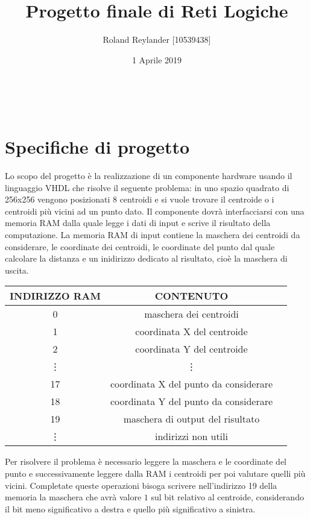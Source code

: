\documentclass{article}
\title{Progetto finale di Reti Logiche}
\author{Roland Reylander [10539438]}
\date{1 Aprile 2019}
\begin{document}
\maketitle
\leavevmode
\\[21\baselineskip]
\tableofcontents


\pagebreak

\section{Specifiche di progetto}
Lo scopo del progetto \`e la realizzazione di un componente hardware usando il linguaggio VHDL che risolve il seguente problema: in uno spazio quadrato di 256x256 vengono posizionati 8 centroidi e si vuole trovare il centroide o i centroidi pi\`{u} vicini ad un punto dato.
\newline
Il componente dovr\`{a} interfacciarsi con una memoria RAM dalla quale legge i dati di input e scrive il risultato della computazione. La memoria RAM di input contiene la maschera dei centroidi da considerare, le coordinate dei centroidi, le coordinate del punto dal quale calcolare la distanza e un inidirizzo dedicato al risultato, cio\`{e} la maschera di uscita.
\newline

\renewcommand{\arraystretch}{1.5}
\begin{center}

\begin{tabular}{ |c|c|c| }
	\hline
	INDIRIZZO RAM & CONTENUTO \\ 
	\hline
	0 & maschera dei centroidi \\
	\hline
	1 & coordinata X del centroide \\
	\hline
	2 & coordinata Y del centroide \\
	\hline
	\vdots & \vdots \\
	\hline
	17 & coordinata X del punto da considerare \\
	\hline
	18 & coordinata Y del punto da considerare \\
	\hline
	19 & maschera di output del risultato \\
	\hline
	\vdots & indirizzi non utili \\
	\hline
\end{tabular}
\end{center}
\leavevmode\newline
Per risolvere il problema \`{e} necessario leggere la maschera e le coordinate del punto e successivamente leggere dalla RAM i centroidi per poi valutare quelli pi\`{u} vicini. Completate queste operazioni bisoga scrivere nell'indirizzo 19 della memoria la maschera che avr\`{a} valore $1$ sul bit relativo al centroide, considerando il bit meno significativo a destra e quello pi\`{u} significativo a sinistra.
\end{document}
